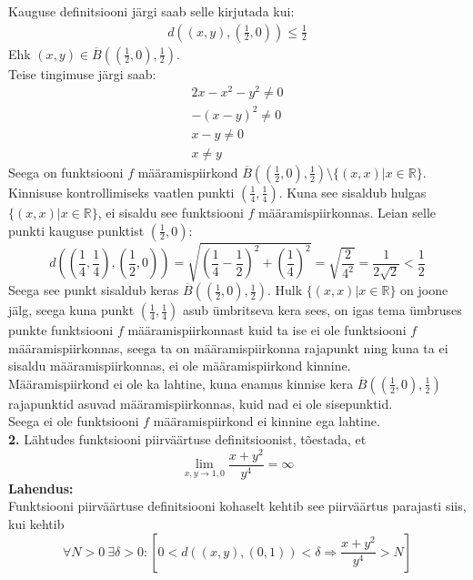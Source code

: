 \documentclass{article}
\begin{document}
Kauguse definitsiooni järgi saab selle kirjutada kui:
\begin{gather*}
d\left((x,y),\left(\frac{1}{2},0\right)\right)\leq\frac{1}{2}
\end{gather*}
Ehk $(x,y)\in\overline{B}\left(\left(\frac{1}{2},0\right),\frac{1}{2}\right)$.\\
Teise tingimuse järgi saab:
\begin{gather*}
2x-x^2-y^2\neq0\\
-(x-y)^2\neq0\\
x-y\neq0\\
x\neq y
\end{gather*}
Seega on funktsiooni $f$ määramispiirkond $\overline{B}\left(\left(\frac{1}{2},0\right),\frac{1}{2}\right)\setminus\{(x,x)|x\in\mathbb{R}\}$.\\
Kinnisuse kontrollimiseks vaatlen punkti $\left(\frac{1}{4},\frac{1}{4}\right)$. Kuna see sisaldub hulgas $\{(x,x)|x\in\mathbb{R}\}$, ei sisaldu see funktsiooni $f$ määramispiirkonnas. Leian selle punkti kauguse punktist $\left(\frac{1}{2},0\right)$:
\begin{equation*}
d\left(\left(\frac{1}{4},\frac{1}{4}\right),\left(\frac{1}{2},0\right)\right)=\sqrt{\left(\frac{1}{4}-\frac{1}{2}\right)^2+\left(\frac{1}{4}\right)^2}=\sqrt{\frac{2}{4^2}}=\frac{1}{2\sqrt{2}}<\frac{1}{2}
\end{equation*}
Seega see punkt sisaldub keras $\overline{B}\left(\left(\frac{1}{2},0\right),\frac{1}{2}\right)$. Hulk $\{(x,x)|x\in\mathbb{R}\}$ on joone jälg, seega kuna punkt $\left(\frac{1}{4},\frac{1}{4}\right)$ asub ümbritseva kera sees, on igas tema ümbruses punkte funktsiooni $f$ määramispiirkonnast kuid ta ise ei ole funktsiooni $f$ määramispiirkonnas, seega ta on määramispiirkonna rajapunkt ning kuna ta ei sisaldu määramispiirkonnas, ei ole määramispiirkond kinnine.\\
Määramispiirkond ei ole ka lahtine, kuna enamus kinnise kera $\overline{B}\left(\left(\frac{1}{2},0\right),\frac{1}{2}\right)$ rajapunktid asuvad määramispiirkonnas, kuid nad ei ole sisepunktid.\\
Seega ei ole funktsiooni $f$ määramispiirkond ei kinnine ega lahtine.\pagebreak\\
\textbf{2. }Lähtudes funktsiooni piirväärtuse definitsioonist, tõestada, et
\begin{equation*}
\lim_{x,y\to1,0}\frac{x+y^2}{y^4}=\infty
\end{equation*}
\textbf{Lahendus:}\\
Funktsiooni piirväärtuse definitsiooni kohaselt kehtib see piirväärtus parajasti siis, kui kehtib
\begin{equation*}
\forall N>0\ \exists\delta>0:[0<d((x,y),(0,1))<\delta\Rightarrow\frac{x+y^2}{y^4}>N]
\end{equation*} 
\end{document}
